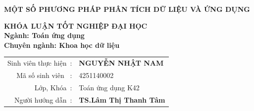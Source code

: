 \documentclass[12pt,a4paper,oneside]{report}
\numberwithin{equation}{section}
\begin{document}
\vskip 3cm
\begin{center}
{\bf\fontsize{22pt}{22}\selectfont MỘT SỐ PHƯƠNG PHÁP PHÂN TÍCH DỮ LIỆU VÀ ỨNG DỤNG}



\vskip 3.5cm
{\bf\fontsize{16pt}{22}\selectfont KHÓA LUẬN TỐT NGHIỆP ĐẠI HỌC}\\
\vskip 0.5cm
{\bf\fontsize{16pt}{22}\selectfont Ngành: Toán ứng dụng}\\
\vskip 0.05cm
{\bf\fontsize{16pt}{22}\selectfont Chuyên ngành: Khoa học dữ liệu}\\
\vskip 2.5cm
\end{center}
\begin{table}[!htb]
	\centering
	\fontsize{14pt}{14pt}\selectfont 
	\begin{tabular}{rl}	
		Sinh viên thực hiện~:&\textbf{NGUYỄN NHẬT NAM} \\

		 Mã số sinh viên  ~: &4251140002\\
		Lớp, Khóa~:&Toán ứng dụng K42\\
				Người hướng dẫn~:&\textbf{TS.Lâm Thị Thanh Tâm} \\
	\end{tabular}
\end{table}
\end{document}
